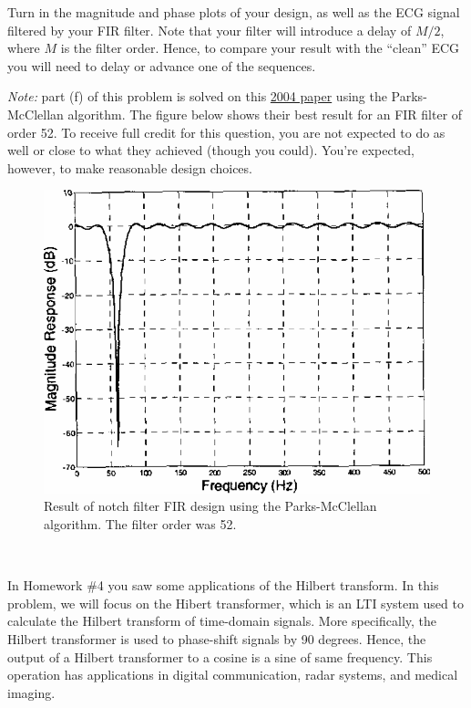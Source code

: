 \documentclass[12pt]{report}
\begin{document}
\begin{description}
	Turn in the magnitude and phase plots of your design, as well as the ECG signal filtered by your FIR filter. Note that your filter will introduce a delay of $M/2$, where $M$ is the filter order. Hence, to compare your result with the ``clean'' ECG you will need to delay or advance one of the sequences.
	
	\textit{Note:} part (f) of this problem is solved on this \href{http://ieeexplore.ieee.org/document/1351410/}{2004 paper} using the Parks-McClellan algorithm. The figure below shows their best result for an FIR filter of order 52. To receive full credit for this question, you are not expected to do as well or close to what they achieved (though you could). You're expected, however, to make reasonable design choices. 
	
	\FloatBarrier
	\begin{figure}[h!]
		\centering
		\includegraphics[scale=0.4]{figs/notch_fir_paper_2004.png}
		\caption{Result of notch filter FIR design using the Parks-McClellan algorithm. The filter order was 52.}
	\end{figure}
	\FloatBarrier
	 
\end{description}

\mbox{}\\

In Homework \#4 you saw some applications of the Hilbert transform. In this problem, we will focus on the Hibert transformer, which is an LTI system used to calculate the Hilbert transform of time-domain signals. More specifically, the Hilbert transformer is used to phase-shift signals by 90 degrees. Hence, the output of a Hilbert transformer to a cosine is a sine of same frequency. This operation has applications in digital communication, radar systems, and medical imaging.
\end{document}
